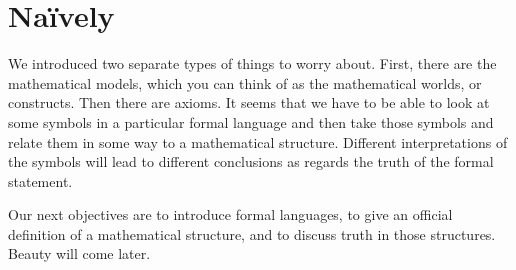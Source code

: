 \section{Naïvely}\label{sec:1.1}

\begin{note}
  We introduced two separate types of things to worry about.
  First, there are the mathematical models, which you can think of as the mathematical worlds, or constructs.
  Then there are axioms.
  It seems that we have to be able to look at some symbols in a particular formal language and then take those symbols and relate them in some way to a mathematical structure.
  Different interpretations of the symbols will lead to different conclusions as regards the truth of the formal statement.

  Our next objectives are to introduce formal languages, to give an official definition of a mathematical structure, and to discuss truth in those structures.
  Beauty will come later.
\end{note}

